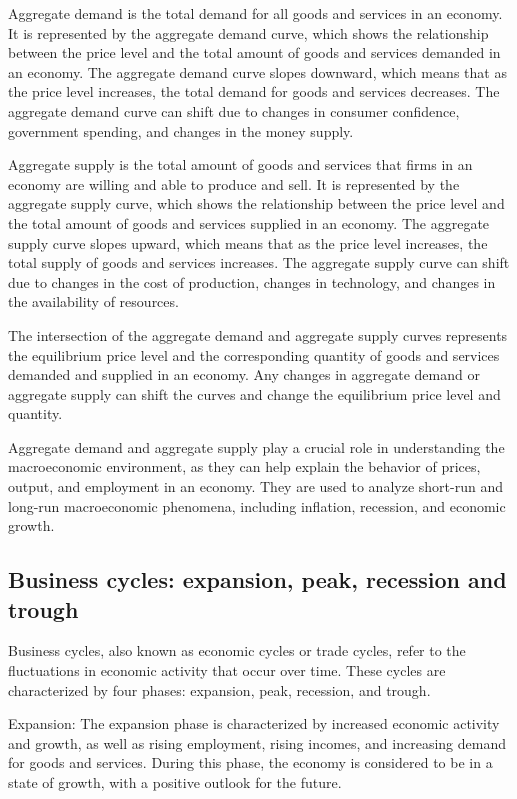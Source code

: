 \documentclass[12pt, a4paper, oneside]{article}
\begin{document}
Aggregate demand is the total demand for all goods and services in an economy. It is represented by the aggregate demand curve, which shows the relationship between the price level and the total amount of goods and services demanded in an economy. The aggregate demand curve slopes downward, which means that as the price level increases, the total demand for goods and services decreases. The aggregate demand curve can shift due to changes in consumer confidence, government spending, and changes in the money supply.

Aggregate supply is the total amount of goods and services that firms in an economy are willing and able to produce and sell. It is represented by the aggregate supply curve, which shows the relationship between the price level and the total amount of goods and services supplied in an economy. The aggregate supply curve slopes upward, which means that as the price level increases, the total supply of goods and services increases. The aggregate supply curve can shift due to changes in the cost of production, changes in technology, and changes in the availability of resources.

The intersection of the aggregate demand and aggregate supply curves represents the equilibrium price level and the corresponding quantity of goods and services demanded and supplied in an economy. Any changes in aggregate demand or aggregate supply can shift the curves and change the equilibrium price level and quantity.

Aggregate demand and aggregate supply play a crucial role in understanding the macroeconomic environment, as they can help explain the behavior of prices, output, and employment in an economy. They are used to analyze short-run and long-run macroeconomic phenomena, including inflation, recession, and economic growth.




\subsection{ Business cycles: expansion, peak, recession and trough }
Business cycles, also known as economic cycles or trade cycles, refer to the fluctuations in economic activity that occur over time. These cycles are characterized by four phases: expansion, peak, recession, and trough.

Expansion: The expansion phase is characterized by increased economic activity and growth, as well as rising employment, rising incomes, and increasing demand for goods and services. During this phase, the economy is considered to be in a state of growth, with a positive outlook for the future.
\end{document}
